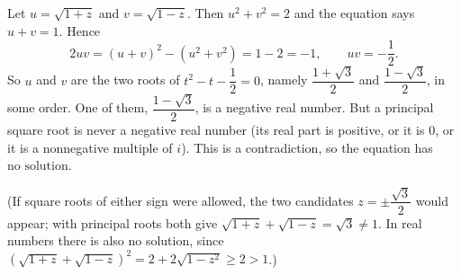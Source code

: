 Let $u=\sqrt{1+z}$ and $v=\sqrt{1-z}$. Then $u^2+v^2=2$ and the equation says $u+v=1$. Hence
\[
2uv=(u+v)^2-(u^2+v^2)=1-2=-1,\qquad uv=-\dfrac{1}{2} .
\]
So $u$ and $v$ are the two roots of $t^2-t-\dfrac{1}{2}=0$, namely $\dfrac{1+\sqrt3}{2}$ and $\dfrac{1-\sqrt3}{2}$, in some order. One of them, $\dfrac{1-\sqrt3}{2}$, is a negative real number. But a principal square root is never a negative real number (its real part is positive, or it is $0$, or it is a nonnegative multiple of $i$). This is a contradiction, so the equation has $\boxed{\text{no solution}}$.

(If square roots of either sign were allowed, the two candidates $z=\pm\dfrac{\sqrt3}{2}$ would appear; with principal roots both give $\sqrt{1+z}+\sqrt{1-z}=\sqrt3\ne1$. In real numbers there is also no solution, since $\left(\sqrt{1+z}+\sqrt{1-z}\right)^2=2+2\sqrt{1-z^2}\ge2>1$.)
